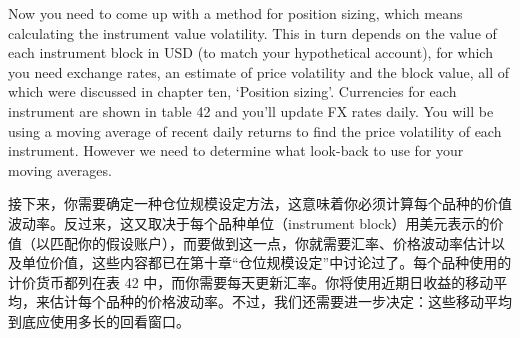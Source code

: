 
\begin{englishblock} Now you need to come up with a method for position sizing, which means calculating the instrument value volatility. This in turn depends on the value of each instrument block in USD (to match your hypothetical account), for which you need exchange rates, an estimate of price volatility and the block value, all of which were discussed in chapter ten, ‘Position sizing'. Currencies for each instrument are shown in table 42 and you'll update FX rates daily. You will be using a moving average of recent daily returns to find the price volatility of each instrument. However we need to determine what look-back to use for your moving averages. \end{englishblock}

\begin{chineseblock}接下来，你需要确定一种仓位规模设定方法，这意味着你必须计算每个品种的价值波动率。反过来，这又取决于每个品种单位（instrument block）用美元表示的价值（以匹配你的假设账户），而要做到这一点，你就需要汇率、价格波动率估计以及单位价值，这些内容都已在第十章“仓位规模设定”中讨论过了。每个品种使用的计价货币都列在表 42 中，而你需要每天更新汇率。你将使用近期日收益的移动平均，来估计每个品种的价格波动率。不过，我们还需要进一步决定：这些移动平均到底应使用多长的回看窗口。\end{chineseblock}

\bipairgap

